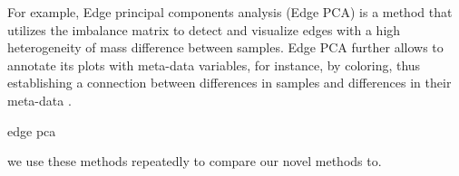 For example, Edge principal components analysis (Edge PCA) \cite{Matsen2011a}
is a method that utilizes the imbalance matrix to detect and visualize edges
with a high heterogeneity of mass difference between samples.
Edge PCA further allows to annotate its plots with meta-data variables, for instance, by coloring,
thus establishing a connection between differences in samples and differences in their meta-data \cite{Srinivasan2012}.

edge pca
\cite{Matsen2011a,Evans2012}

we use these methods repeatedly to compare our novel methods to.

